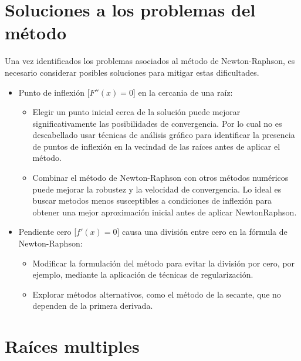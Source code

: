 \documentclass[conference]{IEEEtran}
\begin{document}
\section{Soluciones a los problemas del método}

Una vez identificados los problemas asociados al método de Newton-Raphson, es necesario considerar posibles soluciones para mitigar estas dificultades.

\begin{itemize}
	\item Punto de inflexión [$F''(x) = 0$] en la cercania de una raíz:
	      \begin{itemize}
		      \item  Elegir un punto inicial cerca de la solución puede mejorar significativamente las posibilidades de convergencia. Por lo cual no es descabellado usar técnicas de análisis gráfico para identificar
		            la presencia de puntos de inflexión en la vecindad de las
		            raíces antes de aplicar el método.

		      \item  Combinar el método de Newton-Raphson con otros métodos numéricos puede mejorar la robustez y la velocidad de convergencia. Lo ideal es buscar metodos menos susceptibles a condiciones de
		            inflexión para obtener una mejor aproximación inicial antes de aplicar  NewtonRaphson.
		            
        
	      \end{itemize}

	

	
	\item Pendiente cero [$f'(x) = 0$] causa una división entre cero en la
	      fórmula de Newton-Raphson:
	      \begin{itemize}
		      \item Modificar la formulación del método para evitar la división
		            por cero, por ejemplo, mediante la aplicación de técnicas de
		            regularización.
		      \item Explorar métodos alternativos, como el método de la
		            secante, que no dependen de la primera derivada.

	      \end{itemize}
\end{itemize}

\section{Raíces multiples}
\end{document}

